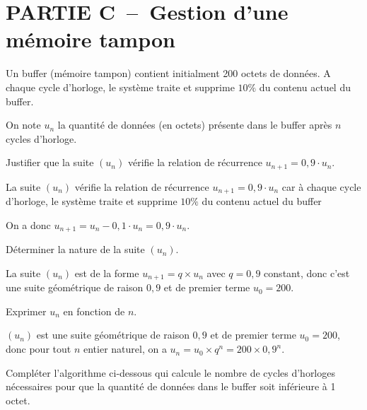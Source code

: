 \bigskip

\thispagestyle{DS_LP}

\section*{PARTIE C~--~Gestion d'une mémoire tampon}

Un buffer (mémoire tampon) contient initialment 200 octets de données. A chaque cycle d'horloge, le système traite et supprime $10\%$ du contenu actuel du buffer.

On note $u_n$ la quantité de données (en octets) présente dans le buffer après $n$ cycles d'horloge.

\begin{enumerate}[series=monDS, resume]
    \item Justifier que la suite $(u_n)$ vérifie la relation de récurrence $u_{n+1}=0,9\cdot u_n$.
    \begin{blocvisiblex}[height=3.5]
    {\quad}
    La suite $(u_n)$ vérifie la relation de récurrence $u_{n+1}=0,9\cdot u_n$ car à chaque cycle d'horloge, le système traite et supprime $10\%$ du contenu actuel du buffer

    On a donc $u_{n+1}=u_n-0,1\cdot u_n=0,9\cdot u_n$.

    \end{blocvisiblex}
    \medskip
    \item Déterminer la nature de la suite $(u_n)$. 
    \begin{blocvisiblex}[height=2]
    {\quad}

    La suite $(u_n)$ est de la forme $u_{n+1}=q \times u_n$ avec $q=0,9$ constant, donc c'est une suite géométrique de raison $0,9$ et de premier terme $u_0=200$.
    \end{blocvisiblex}
    \medskip
    \item Exprimer $u_n$ en fonction de $n$. 
    \begin{blocvisiblex}[height=2]
    {\quad}
    $(u_n)$ est une suite géométrique de raison $0,9$ et de premier terme $u_0=200$, donc pour tout $n$ entier naturel, on a $u_n=u_0 \times q^n=200 \times 0,9^n$.
    \end{blocvisiblex}
    \medskip
    \begin{minipage}{0.45\textwidth}
    \item Compléter l'algorithme ci-dessous qui calcule le nombre de cycles d'horloges nécessaires pour que la quantité de données dans le buffer soit inférieure à 1 octet.


\end{minipage}
\end{enumerate}
